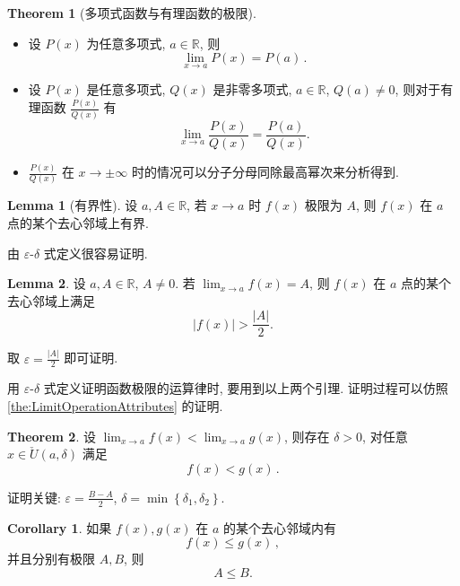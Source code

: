 \documentclass{book}
\newcommand{\set}[1]{\left\{#1\right\}}
\newcommand{\abs}[1]{\left\lvert #1 \right\rvert}
\newcommand{\R}{\mathbb{R}}
\newcommand{\puncU}[1]{\check{U}\!\left( #1 \right)}
\renewcommand{\le}{\leqslant}
\numberwithin{equation}{section}
\numberwithin{figure}{section}
\theoremstyle{definition}
\newtheorem{theorem}{Theorem}[section]
\newtheorem{lemma}{Lemma}[section]
\newtheorem{corollary}{Corollary}[section]
\begin{document}
\begin{theorem}[多项式函数与有理函数的极限]
  \begin{itemize}
      \leavevmode

    \item 设 $P(x)$ 为任意多项式, $a\in\R$, 则
      \begin{equation*}
	\lim_{x\to a}P(x)=P(a)\,.
      \end{equation*}
    \item 设 $P(x)$ 是任意多项式, $Q(x)$ 是非零多项式, $a\in\R$, $Q(a)\neq0$, 则对于有理函数 $\frac{P(x)}{Q(x)}$ 有
      \begin{equation*}
	\lim_{x\to a}\frac{P(x)}{Q(x)}=\frac{P(a)}{Q(x)}.
      \end{equation*}
    \item $\frac{P(x)}{Q(x)}$ 在 $x\to \pm\infty$ 时的情况可以分子分母同除最高幂次来分析得到.
  \end{itemize}
\end{theorem}

\begin{lemma}[有界性]
  设 $a,A\in\R$, 若 $x\to a$ 时 $f(x)$ 极限为 $A$, 则 $f(x)$ 在 $a$ 点的某个去心邻域上有界.
\end{lemma}
由 $\varepsilon$-$\delta$ 式定义很容易证明.

\begin{lemma}
  设 $a,A\in\R$, $A\neq0$. 若 $\lim_{x\to a}f(x)=A$, 则 $f(x)$ 在 $a$ 点的某个去心邻域上满足
  \begin{equation*}
    \abs{f(x)}>\frac{\abs{A}}{2}.
  \end{equation*}
\end{lemma}
取 $\varepsilon=\frac{\abs{A}}{2}$ 即可证明.

用 $\varepsilon$-$\delta$ 式定义证明函数极限的运算律时, 要用到以上两个引理. 证明过程可以仿照 \cref{the:LimitOperationAttributes} 的证明.

\begin{theorem}
  设 $\lim_{x\to a} f(x)<\lim_{x\to a}g(x)$, 则存在 $\delta>0$, 对任意 $x\in\puncU{a,\delta}$ 满足
  \begin{equation*}
    f(x)<g(x)\,.
  \end{equation*}
\end{theorem}
证明关键: $\varepsilon=\frac{B-A}{2}$, $\delta=\min\set{\delta_1,\delta_2}$.

\begin{corollary}
  如果 $f(x),g(x)$ 在 $a$ 的某个去心邻域内有
  \begin{equation*}
    f(x)\le g(x)\,,
  \end{equation*}
  并且分别有极限 $A,B$, 则
  \begin{equation*}
    A\le B.
  \end{equation*}
\end{corollary}
\end{document}
